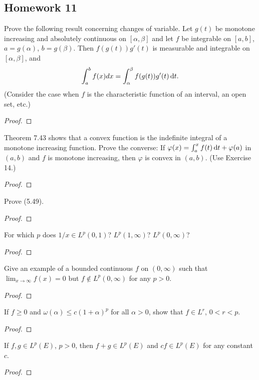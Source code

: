 \subsection{Homework 11}
\begin{problem}
Prove the following result concerning changes of variable. Let $g(t)$ be
monotone increasing and absolutely continuous on $[\alpha,\beta]$ and let $f$
be integrable on $[a,b]$, $a= g(\alpha)$, $b=
g(\beta)$. Then $f(g(t))g'(t)$ is measurable and integrable on
$[\alpha,\beta]$, and
\[
\int_a^b f(x)d x=\int_\alpha^\beta f(g(t))g'(t)\mathop{}\!\mathrm{d} t.
\]
(Consider the case when $f$ is the characteristic function of an interval,
an open set, etc.)
\end{problem}
\begin{proof}
\end{proof}

\begin{problem}
Theorem 7.43 shows that a convex function is the indefinite integral of a
monotone increasing function. Prove the converse: If
$\varphi(x)=\int_a^xf(t)\mathop{}\!\mathrm{d} t+\varphi(a)$ in $(a,b)$ and $f$ is monotone
increasing, then $\varphi$ is convex in $(a,b)$. (Use Exercise 14.)
\end{problem}
\begin{proof}
\end{proof}

\begin{problem}
Prove (5.49).
\end{problem}
\begin{proof}
\end{proof}

\begin{problem}
For which $p$ does $1/x\in L^p(0,1)$? $L^p(1,\infty)$? $L^p(0,\infty)$?
\end{problem}
\begin{proof}
\end{proof}

\begin{problem}
Give an example of a bounded continuous $f$ on $(0,\infty)$ such that
$\lim_{x\to\infty}f(x)=0$ but $f\notin L^p(0,\infty)$ for any $p>0$.
\end{problem}
\begin{proof}
\end{proof}

\begin{problem}
If $f\geq 0$ and $\omega(\alpha)\leq c(1+\alpha)^p$ for all $\alpha>0$,
show that $f\in L^r$, $0<r<p$.
\end{problem}
\begin{proof}
\end{proof}

\begin{problem}
 If $f,g\in L^p(E)$, $p>0$, then $f+g\in L^p(E)$ and $cf\in L^p(E)$ for any
 constant $c$.
\end{problem}
\begin{proof}
\end{proof}

